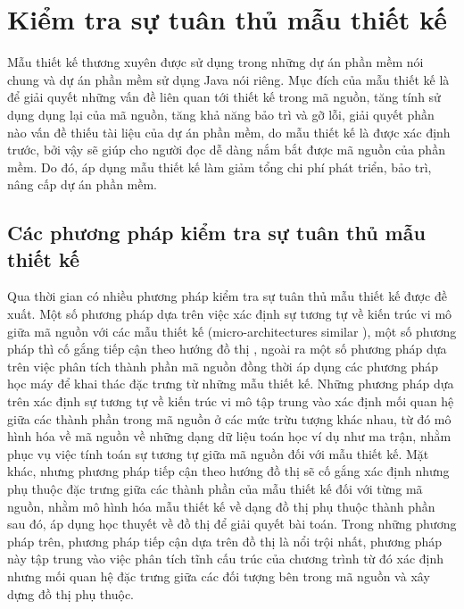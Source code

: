 \documentclass[12pt]{report}
\begin{document}
\section{Kiểm tra sự tuân thủ mẫu thiết kế}
Mẫu thiết kế thương xuyên được sử dụng trong những dự án phần mềm nói chung và dự án phần mềm sử dụng Java nói riêng. Mục đích của mẫu thiết kế là để giải quyết những vấn đề liên quan tới thiết kế trong mã nguồn, tăng tính sử dụng dụng lại của mã nguồn, tăng khả năng bảo trì và gỡ lỗi, giải quyết phần nào vấn đề thiếu tài liệu của dự án phần mềm, do mẫu thiết kế là được xác định trước, bởi vậy sẽ giúp cho người đọc dễ dàng nắm bắt được mã nguồn của phần mềm. Do đó, áp dụng mẫu thiết kế làm giảm tổng chi phí phát triển, bảo trì, nâng cấp dự án phần mềm.
\subsection{Các phương pháp kiểm tra sự tuân thủ mẫu thiết kế}
Qua thời gian có nhiều phương pháp kiểm tra sự tuân thủ mẫu thiết kế được đề xuất. Một số phương pháp dựa trên việc xác định sự tương tự về kiến trúc vi mô giữa mã nguồn với các mẫu thiết kế (micro-architectures similar \cite{micro}), một số phương pháp thì cố gắng tiếp cận theo hướng đồ thị \cite{dong-2008}, ngoài ra một số phương pháp dựa trên việc phân tích thành phần mã nguồn đồng thời áp dụng các phương pháp học máy để khai thác đặc trưng từ những mẫu thiết kế. Những phương pháp dựa trên xác định sự tương tự về kiến trúc vi mô tập trung vào xác định mối quan hệ giữa các thành phần trong mã nguồn ở các mức trừu tượng khác nhau, từ đó mô hình hóa về mã nguồn về những dạng dữ liệu toán học ví dụ như ma trận, nhằm phục vụ việc tính toán sự tương tự giữa mã nguồn đối với mẫu thiết kế.
Mặt khác, nhưng phương pháp tiếp cận theo hướng đồ thị sẽ cố gắng xác định nhưng phụ thuộc đặc trưng giữa các thành phần của mẫu thiết kế đối với từng mã nguồn, nhằm mô hình hóa mẫu thiết kế về dạng đồ thị phụ thuộc thành phần sau đó, áp dụng học thuyết về đồ thị để giải quyết bài toán. Trong những phương pháp trên, phương pháp tiếp cận dựa trên đồ thị là nổi trội nhất, phương pháp này tập trung vào việc phân tích tĩnh cấu trúc của chương trình từ đó xác định nhưng mối quan hệ đặc trưng giữa các đối tượng bên trong mã nguồn và xây dựng đồ thị phụ thuộc.
\end{document}
